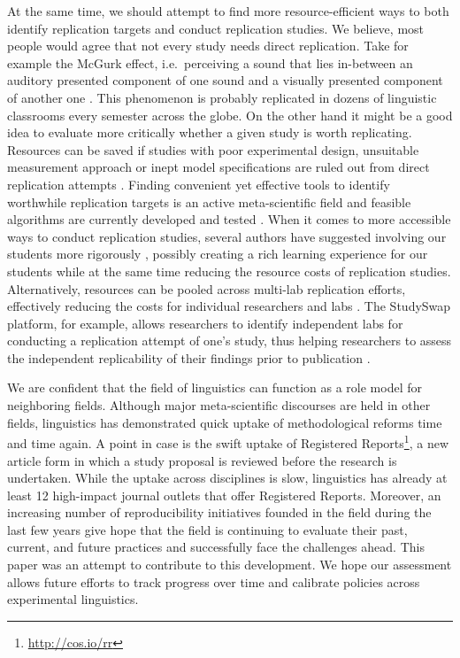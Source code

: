 \documentclass[cm,linguex]{glossa}
\begin{document}
At the same time, we should attempt to find more resource-efficient ways to both identify replication targets and conduct replication studies. We believe, most people would agree that not every study needs direct replication. Take for example the McGurk effect, i.e.~perceiving a sound that lies in-between an auditory presented component of one sound and a visually presented component of another one \citep{mcgurk1976hearing}. This phenomenon is probably replicated in dozens of linguistic classrooms every semester across the globe.
On the other hand it might be a good idea to evaluate more critically whether a given study is worth replicating. Resources can be saved if studies with poor experimental design, unsuitable measurement approach or inept model specifications are ruled out from direct replication attempts \citep{yarkoni2019generalizability}.
Finding convenient yet effective tools to identify worthwhile replication targets is an active meta-scientific field \citep[e.g.,][]{coles2018costs, isager2021deciding, hardwicke2018bayesian} and feasible algorithms are currently developed and tested \citep{isager2021replication}.
When it comes to more accessible ways to conduct replication studies, several authors have suggested involving our students more rigorously \citep[e.g.,][]{de2019using, frank2012teaching, grahe2012harnessing, roettger_toward_2019}, possibly creating a rich learning experience for our students while at the same time reducing the resource costs of replication studies. Alternatively, resources can be pooled across multi-lab replication efforts, effectively reducing the costs for individual researchers and labs \citep[e.g.,][]{frank2017collaborative, nieuwland_large-scale_2018, open_science_collaboration_estimating_2015}. The StudySwap platform, for example, allows researchers to identify independent labs for conducting a replication attempt of one's study, thus helping researchers to assess the independent replicability of their findings prior to publication \citep{chartier_studyswap_2018}.

We are confident that the field of linguistics can function as a role model for neighboring fields. Although major meta-scientific discourses are held in other fields, linguistics has demonstrated quick uptake of methodological reforms time and time again. A point in case is the swift uptake of Registered Reports\footnote{\url{http://cos.io/rr}}, a new article form in which a study proposal is reviewed before the research is undertaken. While the uptake across disciplines is slow, linguistics has already at least 12 high-impact journal outlets that offer Registered Reports. Moreover, an increasing number of reproducibility initiatives founded in the field during the last few years give hope that the field is continuing to evaluate their past, current, and future practices and successfully face the challenges ahead. This paper was an attempt to contribute to this development. We hope our assessment allows future efforts to track progress over time and calibrate policies across experimental linguistics.
\end{document}
